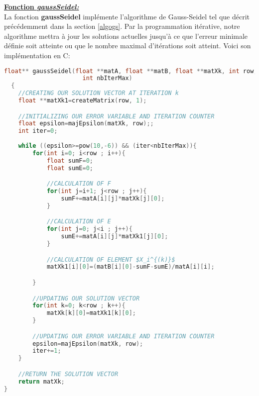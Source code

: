 \documentclass{report}
\begin{document}
\textbf{\underline{Fonction \textit{gaussSeidel:}}}\vspace{6pt}\\
La fonction \textbf{gaussSeidel} implémente l'algorithme de Gauss-Seidel tel que décrit précédemment dans la section \ref{algogs}. Par la programmation itérative, notre algorithme mettra à jour les solutions actuelles jusqu'à ce que l'erreur minimale définie soit atteinte ou que le nombre maximal d'itérations soit atteint. Voici son implémentation en C:
\begin{lstlisting}[mathescape=true, language=C,inputencoding=utf8, basicstyle=\fontsize{8}{10}\selectfont]
  float** gaussSeidel(float **matA, float **matB, float **matXk, int row, int column, 
                      int nbIterMax)
  {
    //CREATING OUR SOLUTION VECTOR AT ITERATION k
    float **matXk1=createMatrix(row, 1);

    //INITIALIZING OUR ERROR VARIABLE AND ITERATION COUNTER
    float epsilon=majEpsilon(matXk, row);;
    int iter=0;
    
    while ((epsilon>=pow(10,-6)) && (iter<nbIterMax)){
        for(int i=0; i<row ; i++){
            float sumF=0;
            float sumE=0;

            //CALCULATION OF F
            for(int j=i+1; j<row ; j++){
                sumF+=matA[i][j]*matXk[j][0];
            }

            //CALCULATION OF E
            for(int j=0; j<i ; j++){
                sumE+=matA[i][j]*matXk1[j][0];
            }

            //CALCULATION OF ELEMENT $X_i^{(k)}$
            matXk1[i][0]=(matB[i][0]-sumF-sumE)/matA[i][i];

        }

        //UPDATING OUR SOLUTION VECTOR
        for(int k=0; k<row ; k++){
            matXk[k][0]=matXk1[k][0];
        }

        //UPDATING OUR ERROR VARIABLE AND ITERATION COUNTER
        epsilon=majEpsilon(matXk, row);
        iter+=1;
    }

    //RETURN THE SOLUTION VECTOR
    return matXk;
}
\end{lstlisting}
\end{document}
